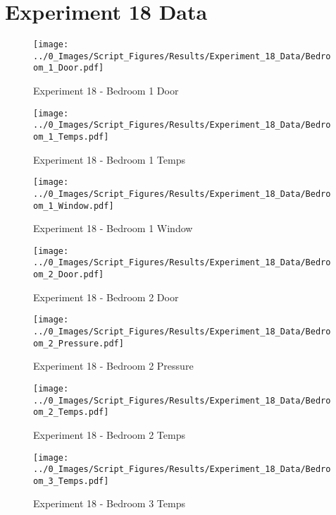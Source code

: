 	\clearpage

\clearpage		\large
\section{Experiment 18 Data} \label{App:Exp18Results} 

	\begin{figure}[H]
		\centering
		\texttt{[image: ../0\_Images/Script\_Figures/Results/Experiment\_18\_Data/Bedroom\_1\_Door.pdf]}
		\caption[]{Experiment 18 - Bedroom 1 Door}
	\end{figure}
 

	\begin{figure}[H]
		\centering
		\texttt{[image: ../0\_Images/Script\_Figures/Results/Experiment\_18\_Data/Bedroom\_1\_Temps.pdf]}
		\caption[]{Experiment 18 - Bedroom 1 Temps}
	\end{figure}
 
	\clearpage

	\begin{figure}[H]
		\centering
		\texttt{[image: ../0\_Images/Script\_Figures/Results/Experiment\_18\_Data/Bedroom\_1\_Window.pdf]}
		\caption[]{Experiment 18 - Bedroom 1 Window}
	\end{figure}
 

	\begin{figure}[H]
		\centering
		\texttt{[image: ../0\_Images/Script\_Figures/Results/Experiment\_18\_Data/Bedroom\_2\_Door.pdf]}
		\caption[]{Experiment 18 - Bedroom 2 Door}
	\end{figure}
 
	\clearpage

	\begin{figure}[H]
		\centering
		\texttt{[image: ../0\_Images/Script\_Figures/Results/Experiment\_18\_Data/Bedroom\_2\_Pressure.pdf]}
		\caption[]{Experiment 18 - Bedroom 2 Pressure}
	\end{figure}
 

	\begin{figure}[H]
		\centering
		\texttt{[image: ../0\_Images/Script\_Figures/Results/Experiment\_18\_Data/Bedroom\_2\_Temps.pdf]}
		\caption[]{Experiment 18 - Bedroom 2 Temps}
	\end{figure}
 
	\clearpage

	\begin{figure}[H]
		\centering
		\texttt{[image: ../0\_Images/Script\_Figures/Results/Experiment\_18\_Data/Bedroom\_3\_Temps.pdf]}
		\caption[]{Experiment 18 - Bedroom 3 Temps}
	\end{figure}
 

